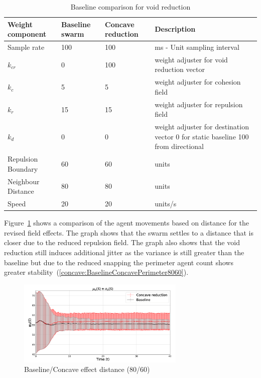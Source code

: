 \documentclass[preprint,12pt]{elsarticle}
\begin{document}
\begin{table}
\caption{Baseline comparison for void reduction} 
\label{tab:BaselineConcaveReduction2}
\begin{center}
\begin{tabular}{| p{1.4cm} | p{1.2cm} | p{1.2cm} | p{2.5cm} |}
\hline
\bf Weight \bf component & \bf Baseline \bf swarm & \bf Concave \bf reduction & \bf Description \\ \hline
Sample rate & 100 & 100 & ms - Unit sampling interval\\  \hline
$k_{cr}$ & 0 & 100 & weight adjuster for void reduction vector\\  \hline
$k_c$ & 5 & 5 & weight adjuster for cohesion field\\  \hline
$k_r$ & 15 & 15 & weight adjuster for repulsion field\\  \hline
$k_d$ & 0 & 0 & weight adjuster for destination vector 0 for static baseline 100 from directional\\  \hline
Repulsion Boundary & 60 & 60 & units\\  \hline
Neighbour Distance & 80 & 80 & units\\  \hline
Speed & 20 & 20 & units/s\\  \hline
\end{tabular}
\end{center}
\end{table}

Figure~\ref{concave:BaselineConcaveEffectDist8060} shows a comparison of the agent movements based on distance for the revised field effects. The graph shows that the swarm settles to a distance that is closer due to the reduced repulsion field. The graph also shows that the void reduction still induces additional jitter as the variance is still greater than the baseline but due to the reduced snapping the perimeter agent count shows greater stability~(\ref{concave:BaselineConcavePerimeter8060}). 
\begin{figure}
\begin{center}
\includegraphics[width=8cm]{figures/BaselineConcaveEffectDist8060}
\end{center}
\caption{Baseline/Concave effect distance (80/60)\label{concave:BaselineConcaveEffectDist8060}}
\end{figure}
\end{document}
